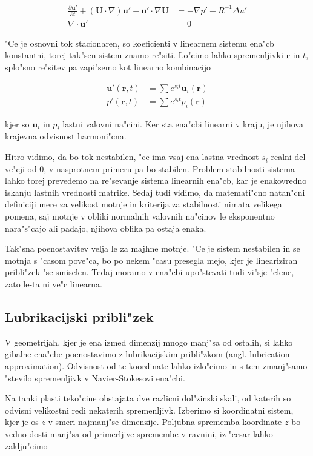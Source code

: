 \documentclass[a4paper,12pt]{article}
\renewcommand{\vec}{\mathbf}
\newcommand{\rt}{(\vec r, t)}
\begin{document}
\begin{align}
 \label{eq:ns-linearna}
\frac{\partial \vec u'}{\partial t} + (\vec U \cdot \nabla) \vec u' + \vec u' \cdot \nabla \vec U &= -\nabla p' + R^{-1}\Delta u' \\
\label{eq:nestisljivost-linearna}
\nabla \cdot \vec u' &= 0
\end{align}

"Ce je osnovni tok stacionaren, so koeficienti v linearnem sistemu ena"cb konstantni, torej tak"sen sistem znamo re"siti. Lo"cimo lahko spremenljivki $\vec r$ in $t$, splo"sno re"sitev pa zapi"semo kot linearno kombinacijo

\begin{align}
 \vec u'\rt &= \sum e^{s_i t} \vec u_i(\vec r) \\
 p'\rt &= \sum e^{s_i t} p_i(\vec r)
\end{align}

kjer so $\vec u_i$ in $p_i$ lastni valovni na"cini. Ker sta ena"cbi linearni v kraju, je njihova krajevna odvisnost harmoni"cna. 

Hitro vidimo, da bo tok nestabilen, "ce ima vsaj ena lastna vrednost $s_i$ realni del ve"cji od 0, v nasprotnem primeru pa bo stabilen. Problem stabilnosti sistema lahko torej prevedemo na re"sevanje sistema linearnih ena"cb, kar je enakovredno iskanju lastnih vrednosti matrike. Sedaj tudi vidimo, da matemati"cno natan"cni definiciji mere za velikost motnje in kriterija za stabilnosti nimata velikega pomena, saj motnje v obliki normalnih valovnih na"cinov le eksponentno nara"s"cajo ali padajo, njihova oblika pa ostaja enaka. 

Tak"sna poenostavitev velja le za majhne motnje. "Ce je sistem nestabilen in se motnja s "casom pove"ca, bo po nekem "casu presegla mejo, kjer je lineariziran pribli"zek "se smiselen. Tedaj moramo v ena"cbi upo"stevati tudi vi"sje "clene, zato le-ta ni ve"c linearna. 

\subsection{Lubrikacijski pribli"zek}
\label{sec:lubrikacijski-priblizek}

V geometrijah, kjer je ena izmed dimenzij mnogo manj"sa od ostalih, si lahko gibalne ena"cbe poenostavimo z lubrikacijskim pribli"zkom (angl. lubrication approximation). Odvisnost od te koordinate lahko izlo"cimo in s tem zmanj"samo "stevilo spremenljivk v Navier-Stokesovi ena"cbi. 

Na tanki plasti teko"cine obstajata dve razlicni dol"zinski skali, od katerih so odvisni velikostni redi nekaterih spremenljivk. Izberimo si koordinatni sistem, kjer je os $z$ v smeri najmanj"se dimenzije. Poljubna sprememba koordinate $z$ bo vedno dosti manj"sa od primerljive spremembe v ravnini, iz "cesar lahko zaklju"cimo 
\end{document}
